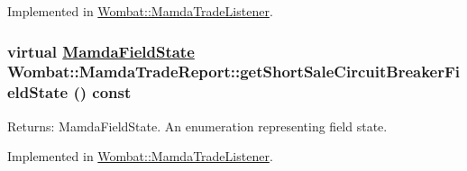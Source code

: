 Implemented in \hyperlink{classWombat_1_1MamdaTradeListener_2475e2a2f9dd0cbd3425b64f84beb258}{Wombat::Mamda\-Trade\-Listener}.\hypertarget{classWombat_1_1MamdaTradeReport_346b7f2e68f75aef22d4a0c8640f1bf4}{
\subsubsection[getShortSaleCircuitBreakerFieldState]{\setlength{\rightskip}{0pt plus 5cm}virtual \hyperlink{namespaceWombat_93aac974f2ab713554fd12a1fa3b7d2a}{Mamda\-Field\-State} Wombat::Mamda\-Trade\-Report::get\-Short\-Sale\-Circuit\-Breaker\-Field\-State () const}}
\label{classWombat_1_1MamdaTradeReport_346b7f2e68f75aef22d4a0c8640f1bf4}


\begin{Desc}
\item[Returns:]Mamda\-Field\-State. An enumeration representing field state. \end{Desc}


Implemented in \hyperlink{classWombat_1_1MamdaTradeListener_2630b69a9a27a1772e3f4315c254a466}{Wombat::Mamda\-Trade\-Listener}.
